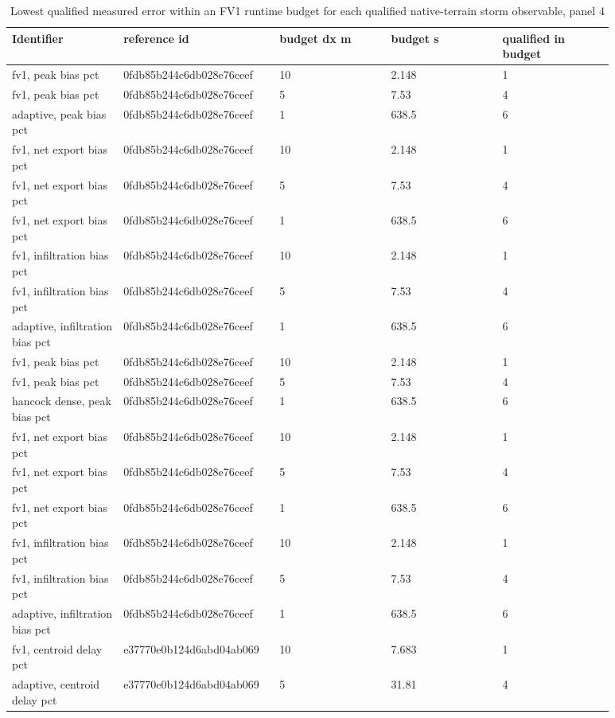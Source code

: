 \begin{longtable}{p{0.1760\linewidth}p{0.1760\linewidth}p{0.1760\linewidth}p{0.1760\linewidth}p{0.1760\linewidth}}
\caption{Lowest qualified measured error within an FV1 runtime budget for each qualified native-terrain storm observable, panel 4}\\
\hline
Identifier & reference id & budget dx m & budget s & qualified in budget \\
\hline\endhead
fv1, peak bias pct & 0fdb85b244c6db028e76ceef & 10 & 2.148 & 1 \\
fv1, peak bias pct & 0fdb85b244c6db028e76ceef & 5 & 7.53 & 4 \\
adaptive, peak bias pct & 0fdb85b244c6db028e76ceef & 1 & 638.5 & 6 \\
fv1, net export bias pct & 0fdb85b244c6db028e76ceef & 10 & 2.148 & 1 \\
fv1, net export bias pct & 0fdb85b244c6db028e76ceef & 5 & 7.53 & 4 \\
fv1, net export bias pct & 0fdb85b244c6db028e76ceef & 1 & 638.5 & 6 \\
fv1, infiltration bias pct & 0fdb85b244c6db028e76ceef & 10 & 2.148 & 1 \\
fv1, infiltration bias pct & 0fdb85b244c6db028e76ceef & 5 & 7.53 & 4 \\
adaptive, infiltration bias pct & 0fdb85b244c6db028e76ceef & 1 & 638.5 & 6 \\
fv1, peak bias pct & 0fdb85b244c6db028e76ceef & 10 & 2.148 & 1 \\
fv1, peak bias pct & 0fdb85b244c6db028e76ceef & 5 & 7.53 & 4 \\
hancock dense, peak bias pct & 0fdb85b244c6db028e76ceef & 1 & 638.5 & 6 \\
fv1, net export bias pct & 0fdb85b244c6db028e76ceef & 10 & 2.148 & 1 \\
fv1, net export bias pct & 0fdb85b244c6db028e76ceef & 5 & 7.53 & 4 \\
fv1, net export bias pct & 0fdb85b244c6db028e76ceef & 1 & 638.5 & 6 \\
fv1, infiltration bias pct & 0fdb85b244c6db028e76ceef & 10 & 2.148 & 1 \\
fv1, infiltration bias pct & 0fdb85b244c6db028e76ceef & 5 & 7.53 & 4 \\
adaptive, infiltration bias pct & 0fdb85b244c6db028e76ceef & 1 & 638.5 & 6 \\
fv1, centroid delay pct & e37770e0b124d6abd04ab069 & 10 & 7.683 & 1 \\
adaptive, centroid delay pct & e37770e0b124d6abd04ab069 & 5 & 31.81 & 4 \\

\end{longtable}
